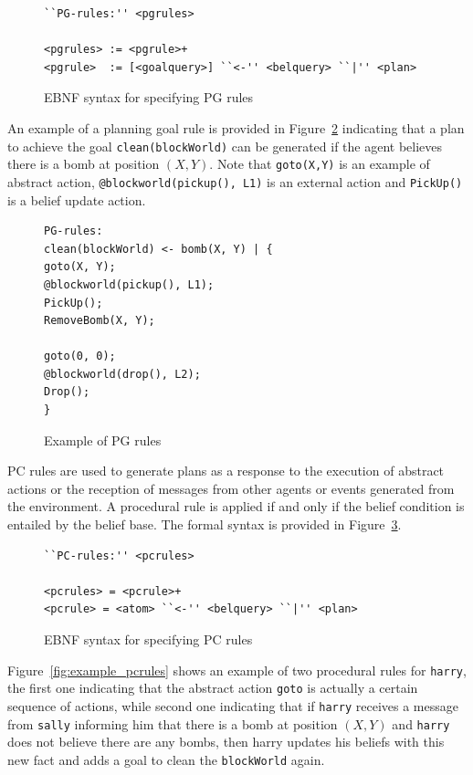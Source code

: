 \documentclass[a4paper]{article}
\begin{document}
\begin{figure}[htp]
\begin{verbatim}
``PG-rules:'' <pgrules>

<pgrules> := <pgrule>+
<pgrule>  := [<goalquery>] ``<-'' <belquery> ``|'' <plan>
\end{verbatim}
\caption{EBNF syntax for specifying PG rules}
\label{fig:ebnf_pgrules}
\end{figure}

An example of a planning goal rule is provided in Figure~\ref{fig:example_pgrules} indicating that a plan to achieve the goal \texttt{clean(blockWorld)} can be generated if the agent believes there is a bomb at position $(X,Y)$. Note that \texttt{goto(X,Y)} is an example of abstract action, \texttt{@blockworld(pickup(), L1)} is an external action and \texttt{PickUp()} is a belief update action.

\begin{figure}[htp]
\begin{verbatim}
PG-rules:
clean(blockWorld) <- bomb(X, Y) | { 
goto(X, Y);
@blockworld(pickup(), L1);
PickUp();
RemoveBomb(X, Y);

goto(0, 0);
@blockworld(drop(), L2);
Drop();
}
\end{verbatim}
\caption{Example of PG rules}
\label{fig:example_pgrules}
\end{figure}

PC rules are used to generate plans as a response to the execution of abstract actions or the reception of messages from other agents or events generated from the environment. A procedural rule is applied if and only if the belief condition is entailed by the belief base. The formal syntax is provided in Figure~\ref{fig:ebnf_pcrules}.

\begin{figure}[htp]
\begin{verbatim}
``PC-rules:'' <pcrules>

<pcrules> = <pcrule>+
<pcrule> = <atom> ``<-'' <belquery> ``|'' <plan>
\end{verbatim}
\caption{EBNF syntax for specifying PC rules}
\label{fig:ebnf_pcrules}
\end{figure}

Figure~\ref{fig:example_pcrules} shows an example of two procedural rules for \texttt{harry}, the first one indicating that the abstract action \texttt{goto} is actually a certain sequence of actions, while second one indicating that if \texttt{harry} receives a message from \texttt{sally} informing him that there is a bomb at position $(X,Y)$ and \texttt{harry} does not believe there are any bombs, then harry updates his beliefs with this new fact and adds a goal to clean the \texttt{blockWorld} again.
\end{document}
